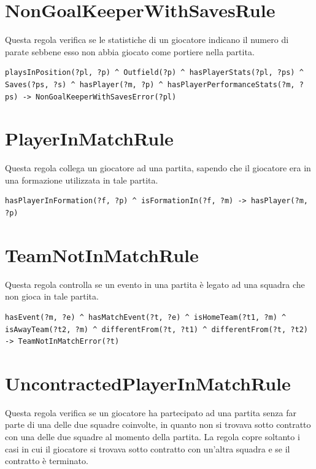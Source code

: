 \documentclass[11pt]{report} %
\begin{document}
\section{NonGoalKeeperWithSavesRule}

Questa regola verifica se le statistiche di un giocatore indicano il numero di parate sebbene esso non abbia giocato come portiere nella partita.

\begin{lstlisting}[language=SWRL]
playsInPosition(?pl, ?p) ^ Outfield(?p) ^ hasPlayerStats(?pl, ?ps) ^ Saves(?ps, ?s) ^ hasPlayer(?m, ?p) ^ hasPlayerPerformanceStats(?m, ?ps) -> NonGoalKeeperWithSavesError(?pl)
\end{lstlisting}

\section{PlayerInMatchRule}

Questa regola collega un giocatore ad una partita, sapendo che il giocatore era in una formazione utilizzata in tale partita.

\begin{lstlisting}[language=SWRL]
hasPlayerInFormation(?f, ?p) ^ isFormationIn(?f, ?m) -> hasPlayer(?m, ?p)
\end{lstlisting}

\section{TeamNotInMatchRule}

Questa regola controlla se un evento in una partita è legato ad una squadra che non gioca in tale partita.

\begin{lstlisting}[language=SWRL]
hasEvent(?m, ?e) ^ hasMatchEvent(?t, ?e) ^ isHomeTeam(?t1, ?m) ^ isAwayTeam(?t2, ?m) ^ differentFrom(?t, ?t1) ^ differentFrom(?t, ?t2) -> TeamNotInMatchError(?t)
\end{lstlisting}

\newpage

\section{UncontractedPlayerInMatchRule}

Questa regola verifica se un giocatore ha partecipato ad una partita senza far parte di una delle due squadre coinvolte, in quanto non si trovava sotto contratto con una delle due squadre al momento della partita.
La regola copre soltanto i casi in cui il giocatore si trovava sotto contratto con un'altra squadra e se il contratto è terminato.
\end{document}
